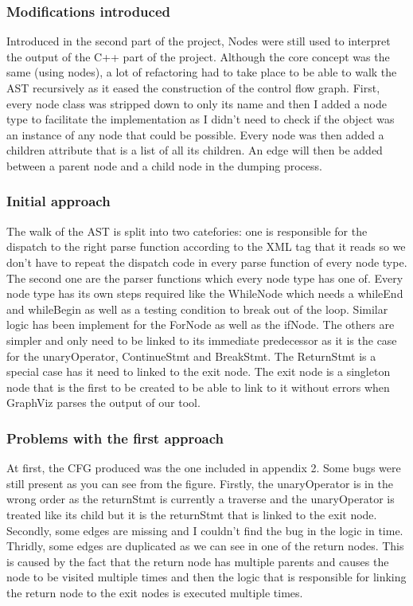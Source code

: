 \documentclass[conference,compsoc]{IEEEtran}
\begin{document}
\subsubsection{Modifications introduced}

 Introduced in the second part of the project, Nodes were still used
 to interpret the output of the C++ part of the project. Although the core concept
 was the same (using nodes), a lot of refactoring had to take place to be able to walk
 the AST recursively as it eased the construction of the control flow graph. First,
 every node class was stripped down to only its name and then I added a node type to
 facilitate the implementation as I didn't need to check if the object was an instance
 of any node that could be possible. Every node was then added a children attribute
 that is a list of all its children. An edge will then be added between a parent node
 and a child node in the dumping process.
\subsubsection{Initial approach}
The walk of the AST is split into two catefories:
 one is responsible for the dispatch to the right parse function according to the XML tag
 that it reads so we don't have to repeat the dispatch code in every parse function of every
 node type. The second one are the parser functions which every node type has one of. Every
 node type has its own steps required like the WhileNode which needs a whileEnd and whileBegin
 as well as a testing condition to break out of the loop. Similar logic has been implement for
 the ForNode as well as the ifNode. The others are simpler and only need to be linked to its
 immediate predecessor as it is the case for the unaryOperator, ContinueStmt and BreakStmt. The
 ReturnStmt is a special case has it need to linked to the exit node. The exit node is a singleton
 node that is the first to be created to be able to link to it without errors when GraphViz parses
 the output of our tool.

\subsubsection{Problems with the first approach}
At first, the CFG produced was the one included in appendix 2. Some bugs were still present as you can see from the
figure. Firstly, the unaryOperator is in the wrong order as the returnStmt is currently a traverse
and the unaryOperator is treated like its child but it is the returnStmt that is linked to the
exit node. Secondly, some edges are missing and I couldn't find the bug in the logic in time.
 Thridly, some edges are duplicated as we can see in one of the return nodes. This is caused by the
 fact that the return node has multiple parents and causes the node to be visited multiple times and
 then the logic that is responsible for linking the return node to the exit nodes is executed
 multiple times.
\end{document}
